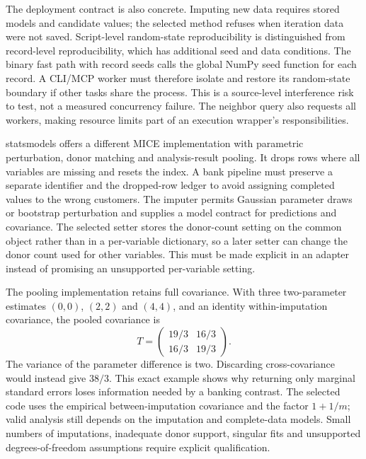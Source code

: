 The deployment contract is also concrete. Imputing new data requires stored models and candidate values; the selected method refuses when iteration data were not saved. Script-level random-state reproducibility is distinguished from record-level reproducibility, which has additional seed and data conditions. The binary fast path with record seeds calls the global NumPy seed function for each record. A CLI/MCP worker must therefore isolate and restore its random-state boundary if other tasks share the process. This is a source-level interference risk to test, not a measured concurrency failure. The neighbor query also requests all workers, making resource limits part of an execution wrapper's responsibilities.~\citep{exec25_ptm_miceforest}

statsmodels offers a different MICE implementation with parametric perturbation, donor matching and analysis-result pooling. It drops rows where all variables are missing and resets the index. A bank pipeline must preserve a separate identifier and the dropped-row ledger to avoid assigning completed values to the wrong customers. The imputer permits Gaussian parameter draws or bootstrap perturbation and supplies a model contract for predictions and covariance. The selected setter stores the donor-count setting on the common object rather than in a per-variable dictionary, so a later setter can change the donor count used for other variables. This must be made explicit in an adapter instead of promising an unsupported per-variable setting.~\citep{exec25_ptm_statsmodels}

The pooling implementation retains full covariance. With three two-parameter estimates $(0,0)$, $(2,2)$ and $(4,4)$, and an identity within-imputation covariance, the pooled covariance is
\[
 T=\begin{pmatrix}19/3&16/3\\16/3&19/3\end{pmatrix}.
\]
The variance of the parameter difference is two. Discarding cross-covariance would instead give $38/3$. This exact example shows why returning only marginal standard errors loses information needed by a banking contrast. The selected code uses the empirical between-imputation covariance and the factor $1+1/m$; valid analysis still depends on the imputation and complete-data models. Small numbers of imputations, inadequate donor support, singular fits and unsupported degrees-of-freedom assumptions require explicit qualification.~\citep{exec25_ptm_statsmodels,exec25_ptm_choice}

